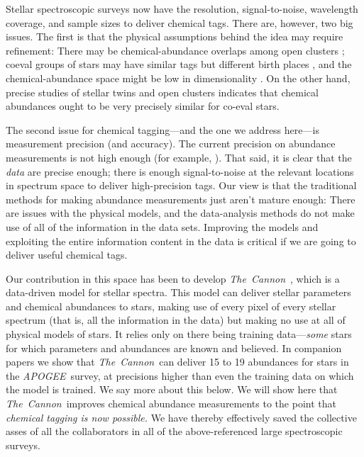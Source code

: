 \documentclass[12pt, letterpaper, preprint]{aastex}
\newcommand{\acronym}[1]{{\small{#1}}}
\newcommand{\project}[1]{\textsl{#1}}
\newcommand{\apogee}{\project{\acronym{APOGEE}}}
\newcommand{\thecannon}{\project{The~Cannon}}
\begin{document}
Stellar spectroscopic surveys now have the resolution, signal-to-noise,
wavelength coverage, and sample sizes to deliver chemical tags.
There are, however, two big issues.
The first is that the physical assumptions behind the idea may require
refinement:
There may be chemical-abundance overlaps among open clusters
\citep{blancocuaresma}; coeval groups of stars may have similar tags
but different birth places \citep{mitschang}, and the
chemical-abundance space might be low in dimensionality \citep{what}.
On the other hand, precise studies of stellar twins \citep{melendez, jofre}
and open clusters \citep{bovy} indicates that chemical abundances ought to be
very precisely similar for co-eval stars.

The second issue for chemical tagging---and the one we address
here---is measurement precision (and accuracy).
The current precision on abundance measurements is not high enough
(for example, \citealt{Ting2015, Martel2015}).
That said, it is clear that the \emph{data} are precise enough;
there is enough signal-to-noise at the relevant locations in spectrum
space to deliver high-precision tags.
Our view is that the traditional methods for making abundance
measurements just aren't mature enough:
There are issues with the physical models, and the data-analysis
methods do not make use of all of the information in the data sets.
Improving the models and exploiting the entire information
content in the data is critical if we are going to deliver useful
chemical tags.

Our contribution in this space has been to develop
\thecannon\ \citep{cannon, ages}, which is a data-driven model for
stellar spectra.
This model can deliver stellar parameters and chemical abundances to
stars, making use of every pixel of every stellar spectrum (that is,
all the information in the data) but making no use at all of physical
models of stars.
It relies only on there being training data---\emph{some} stars for
which parameters and abundances are known and believed.
In companion papers \citep{casey16, ness16} we show that
\thecannon\ can deliver 15 to 19 abundances for stars in the
\apogee\ survey, at precisions higher than even the training data on
which the model is trained.
We say more about this below.
We will show here that \thecannon\ improves chemical abundance measurements
to the point that \emph{chemical tagging is now possible.}
We have thereby effectively saved the collective asses of all the
collaborators in all of the above-referenced large spectroscopic
surveys.
\end{document}
